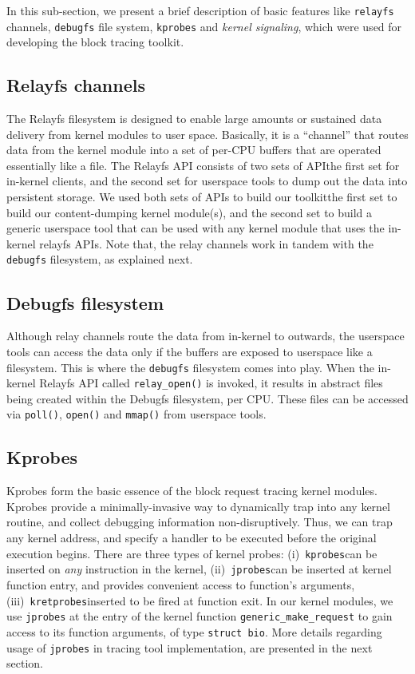 In this sub-section, we present a brief description of basic features like
\texttt{relayfs} channels, \texttt{debugfs} file system, \texttt{kprobes}
and \textit{kernel signaling}, which were used for developing the 
block tracing toolkit.

\subsection{Relayfs channels}
The Relayfs\cite{relayfs} filesystem is designed to enable large amounts 
or sustained
data delivery from kernel modules to user space. Basically, it is a 
``channel'' that routes data from the kernel module into a set of
per-CPU buffers that are operated essentially like a file. 
The Relayfs API consists of two sets of API\textemdash{}the first set for 
in-kernel clients, and the second set for userspace tools to 
dump out the data into persistent storage. We used both sets of APIs
to build our toolkit\textemdash{}the first set to build our content-dumping 
kernel module(s), and the second set to build a generic userspace tool
that can be used with any kernel module that uses the in-kernel 
relayfs APIs. Note that, the relay channels work in tandem with the
\texttt{debugfs} filesystem, as explained next.

\subsection{Debugfs filesystem}
Although relay channels route the data from in-kernel to outwards, the 
userspace tools can access the data only if the buffers are exposed
to userspace like a filesystem. This is where the \texttt{debugfs}\cite{debugfs} 
filesystem comes into play. When the in-kernel Relayfs API called 
\texttt{relay\_open()} is invoked, it results in abstract files being
created within the Debugfs filesystem, per CPU. These files can be 
accessed via \texttt{poll()}, \texttt{open()} and 
\texttt{mmap()} from userspace tools.

\subsection{Kprobes}
Kprobes\cite{kprobes} form the basic essence of the block request tracing 
kernel modules. Kprobes provide a minimally-invasive way to dynamically
trap into any kernel routine, and collect debugging information
non-disruptively. Thus, we can trap any kernel address, and specify
a handler to be executed before the original execution begins. There
are three types of kernel probes: 
(i)~\texttt{kprobes}\textemdash{}can be inserted on \textit{any} instruction in the
kernel,
(ii)~\texttt{jprobes}\textemdash{}can be inserted at kernel function entry, and
provides convenient access to function's arguments,
(iii)~\texttt{kretprobes}\textemdash{}inserted to be fired at function exit.
In our kernel modules, we use \texttt{jprobes} at the entry of the
kernel function \texttt{generic\_make\_request} to gain access to its
function arguments, of type \texttt{struct bio}. More details regarding
usage of \texttt{jprobes} in tracing tool implementation, are presented
in the next section.

